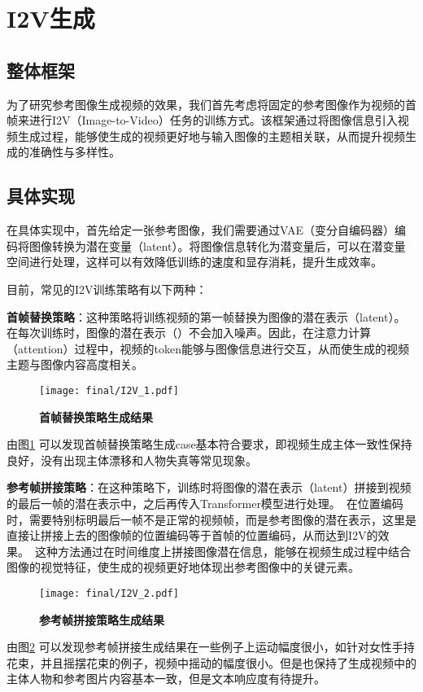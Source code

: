 \cleardoublepage
\section{I2V生成}
\subsection{整体框架}

为了研究参考图像生成视频的效果，我们首先考虑将固定的参考图像作为视频的首帧来进行I2V（Image-to-Video）任务的训练方式。该框架通过将图像信息引入视频生成过程，能够使生成的视频更好地与输入图像的主题相关联，从而提升视频生成的准确性与多样性。\

\subsection{具体实现}

在具体实现中，首先给定一张参考图像，我们需要通过VAE（变分自编码器）编码将图像转换为潜在变量（latent）。将图像信息转化为潜变量后，可以在潜变量空间进行处理，这样可以有效降低训练的速度和显存消耗，提升生成效率。

目前，常见的I2V训练策略有以下两种：

\textbf{首帧替换策略}：这种策略将训练视频的第一帧替换为图像的潜在表示（latent）。在每次训练时，图像的潜在表示（）不会加入噪声。因此，在注意力计算（attention）过程中，视频的token能够与图像信息进行交互，从而使生成的视频主题与图像内容高度相关。
\begin{figure}[htbp]
    \centering
    \texttt{[image: final/I2V\_1.pdf]}
    \caption{\textbf{首帧替换策略生成结果}
    }
    \label{I2V_1}
\end{figure}

由图\ref{I2V_1} 可以发现首帧替换策略生成case基本符合要求，即视频生成主体一致性保持良好，没有出现主体漂移和人物失真等常见现象。


\textbf{参考帧拼接策略}：在这种策略下，训练时将图像的潜在表示（latent）拼接到视频的最后一帧的潜在表示中，之后再传入Transformer模型进行处理。\
在位置编码时，需要特别标明最后一帧不是正常的视频帧，而是参考图像的潜在表示，这里是直接让拼接上去的图像帧的位置编码等于首帧的位置编码，从而达到I2V的效果。\
这种方法通过在时间维度上拼接图像潜在信息，能够在视频生成过程中结合图像的视觉特征，使生成的视频更好地体现出参考图像中的关键元素。
\begin{figure}[htbp]
    \centering
    \texttt{[image: final/I2V\_2.pdf]}
    \caption{\textbf{参考帧拼接策略生成结果}
    }
    \label{I2V_2}
\end{figure}
由图\ref{I2V_2} 可以发现参考帧拼接生成结果在一些例子上运动幅度很小，如针对女性手持花束，并且摇摆花束的例子，视频中摇动的幅度很小。但是也保持了生成视频中的主体人物和参考图片内容基本一致，但是文本响应度有待提升。

